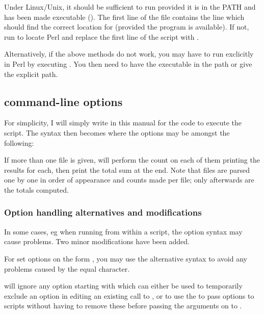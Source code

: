 \documentclass{article}
\begin{document}
Under Linux/Unix, it should be sufficient to run  provided it is in the PATH and has been made executable (). The first line of the file contains the line  which should find the correct location for  (provided the program  is available). If not, run  to locate Perl and replace the first line of the script with .

Alternatively, if the above methods do not work, you may have to run \TeXcount{} exclicitly in Perl by executing . You then need to have the  executable in the path or give the explicit path.

\subsection{\TeXcount{} command-line options}

For simplicity, I will simply write  in this manual for the code to execute the script. The syntax then becomes
where the options may be amongst the following:



If more than one file is given, \TeXcount{} will perform the count on each of them printing the results for each, then print the total sum at the end. Note that files are parsed one by one in order of appearance and counts made per file; only afterwards are the totals computed. 

\subsubsection{Option handling alternatives and modifications}

In some cases, eg when running from within a script, the option syntax may cause problems. Two minor modifications have been added.

For set options on the form \code{-[options]=[value]}, you may use the alternative syntax \code{-[option]:[value]} to avoid any problems caused by the equal character.

\TeXcount{} will ignore any option starting with  which can either be used to temporarily exclude an option in editing an existing call to \TeXcount{}, or to use the  to pass options to scripts without having to remove these before passing the arguments on to \TeXcount{}.
\end{document}
